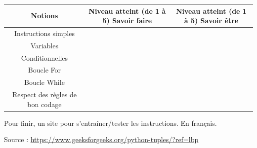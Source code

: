 \begin{table}[H]
    \centering
    \begin{tabular}{|c|c|c|} \hline
        \textbf{Notions} & \textbf{Niveau atteint} (de 1 à 5) \textbf{Savoir faire}  & \textbf{Niveau atteint} (de 1 à 5) \textbf{Savoir être}\\\hline
        Instructions simples & & \\\hline
        Variables &&\\\hline
        Conditionnelles &&\\\hline
        Boucle For &&\\\hline
        Boucle While && \\\hline
        Respect des règles de bon codage && \\\hline
    \end{tabular}
\end{table}



\begin{tcolorbox}[lefttitle=2cm, colframe=gray!75!green, title= \textbf{SUPER TIP}]

Pour finir, un site pour s'entraîner/tester les instructions. En français.

Source : \url{https://www.geeksforgeeks.org/python-tuples/?ref=lbp}
\end{tcolorbox}

